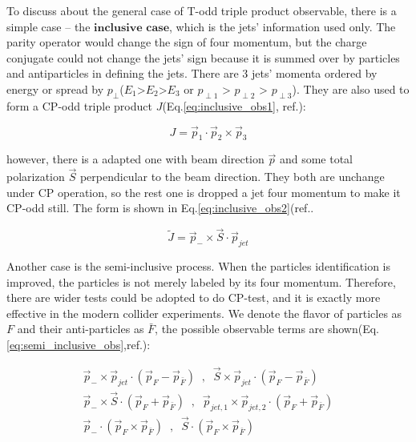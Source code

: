 		To discuss about the general case of T-odd triple product observable, there is a simple case -- the $\textbf{inclusive case}$, which is the jets' information used only. The parity operator would change the sign of four momentum, but the charge conjugate could not change the jets' sign because it is summed over by particles and antiparticles in defining the jets. There are 3 jets' momenta ordered by energy or spread by $p_{\perp}$($E_1$>$E_2$>$E_3$ or $p_{\perp 1}$ > $p_{\perp 2}$ > $p_{\perp 3}$). They are also used to form a CP-odd triple product $J$(Eq.\ref{eq:inclusive_obs1}, ref.\cite{PhysRevLett.58.451}):

		\begin{equation}
		J = \vec{p}_1 \cdot \vec{p}_2 \times \vec{p}_3
		\label{eq:inclusive_obs1}
		\end{equation}
		\FloatBarrier

		however, there is a adapted one with beam direction $\vec{p}$ and some total polarization $\vec{S}$ perpendicular to the beam direction. They both are unchange under CP operation, so the rest one is dropped a jet four momentum to make it CP-odd still. The form is shown in Eq.\ref{eq:inclusive_obs2}(ref.\cite{PhysRevLett.58.451}.

		\begin{equation}
		\widetilde{J} = \vec{p}_- \times \vec{S} \cdot \vec{p}_{jet}
		\label{eq:inclusive_obs2}
		\end{equation}
		\FloatBarrier

		Another case is the semi-inclusive process. When the particles identification is improved, the particles is not merely labeled by its four momentum. Therefore, there are wider tests could be adopted to do CP-test, and it is exactly more effective in the modern collider experiments. We denote the flavor of particles as $F$ and their anti-particles as $\bar{F}$, the possible observable terms are shown(Eq.\ref{eq:semi_inclusive_obs},ref.\cite{PhysRevLett.58.451}):

		\begin{equation}
		\begin{split}
		\vec{p}_- \times \vec{p}_{jet} \cdot ( \vec{p}_F - \vec{p}_{\bar{F}} ) \;\;, \;\; \vec{S} \times \vec{p}_{jet} \cdot ( \vec{p}_F - \vec{p}_{\bar{F}} ) \\
		\vec{p}_- \times \vec{S} \cdot ( \vec{p}_F + \vec{p}_{\bar{F}} ) \;\;, \;\; \vec{p}_{jet,1} \times \vec{p}_{jet,2} \cdot ( \vec{p}_F + \vec{p}_{\bar{F}} ) \\
		\vec{p}_- \cdot ( \vec{p}_F \times \vec{p}_{\bar{F}} ) \;\;,\;\; \vec{S} \cdot ( \vec{p}_F \times \vec{p}_{\bar{F}} )
		\label{eq:semi_inclusive_obs}
		\end{split}
		\end{equation}
		\FloatBarrier

